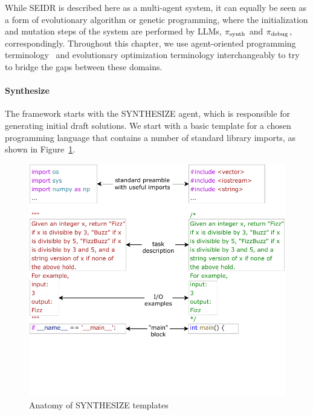 While SEIDR is described here as a multi-agent system, it can equally be seen as a form of evolutionary algorithm or genetic programming, where the initialization and mutation steps of the system are performed by LLMs, $ \pi_\text{synth} $ and $ \pi_\text{debug} $, correspondingly.
Throughout this chapter, we use agent-oriented programming terminology~\cite{shoham1993:agentoriented} and evolutionary optimization terminology interchangeably to try to bridge the gaps between these domains.

\paragraph{Synthesize}
\label{sec:seidr-synth}

The framework starts with the SYNTHESIZE agent, which is responsible for generating initial draft solutions.
We start with a basic template for a chosen programming language that contains a number of standard library imports, as shown in Figure~\ref{fig:template}.

\begin{figure}
    \centering
    \includegraphics[width=\linewidth, trim={0mm 40mm 0mm 0mm}, clip]{images/Templates-new-v2.pdf}
    \caption{Anatomy of SYNTHESIZE templates}
    \label{fig:template}
\end{figure}

